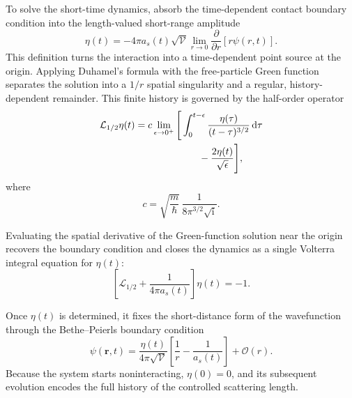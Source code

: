 \documentclass[9pt,a4paper,twocolumn,twoside]{rho-class/rho}
\newcommand{\dd}{\mathrm{d}}
\newcommand{\ii}{\mathrm{i}}
\begin{document}
        To solve the short-time dynamics, absorb the time-dependent contact boundary condition into the length-valued short-range amplitude
        \begin{equation}\label{eq:eta-definition}
            \eta(t)=-4\pi a_s(t)\sqrt{\mathcal V}
            \lim_{r\to0}\frac{\partial}{\partial r}[r\psi(r,t)].
        \end{equation}
        This definition turns the interaction into a time-dependent point source at the origin. Applying Duhamel's formula with the free-particle Green function separates the solution into a $1/r$ spatial singularity and a regular, history-dependent remainder. This finite history is governed by the half-order operator \cite{qi2021maximum}
        \begin{equation}\label{eq:half-order-operator}
            \begin{aligned}
                \mathcal L_{1/2}\eta(t)
                &=c\lim_{\epsilon\to0^+}\Bigg[
                \int_0^{t-\epsilon}
                \frac{\eta(\tau)}{(t-\tau)^{3/2}}\,\dd\tau\\
                &\hspace{23mm}
                -\frac{2\eta(t)}{\sqrt\epsilon}
                \Bigg],
            \end{aligned}
        \end{equation}
        where
        \begin{equation}\label{eq:history-prefactor}
            c=\sqrt{\frac{m}{\hbar}}\,
            \frac{1}{8\pi^{3/2}\sqrt{\ii}}.
        \end{equation}

        Evaluating the spatial derivative of the Green-function solution near the origin recovers the boundary condition and closes the dynamics as a single Volterra integral equation for $\eta(t)$:
        \begin{equation}\label{eq:volterra}
            \left[\mathcal L_{1/2}
            +\frac{1}{4\pi a_s(t)}\right]\eta(t)=-1.
        \end{equation}

        Once $\eta(t)$ is determined, it fixes the short-distance form of the wavefunction through the Bethe--Peierls boundary condition
        \begin{equation}\label{eq:bethe-peierls-eta}
            \psi(\mathbf r,t)=\frac{\eta(t)}{4\pi\sqrt{\mathcal V}}
            \left[\frac{1}{r}-\frac{1}{a_s(t)}\right]+\mathcal O(r).
        \end{equation}
        Because the system starts noninteracting, $\eta(0)=0$, and its subsequent evolution encodes the full history of the controlled scattering length.
\end{document}

